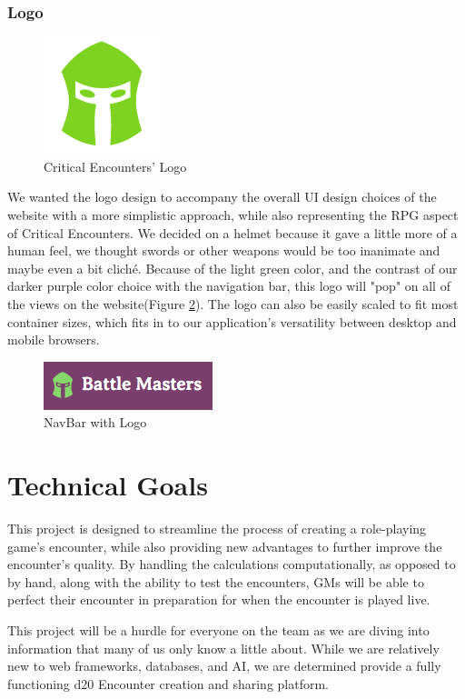 \documentclass[12pt,a4paper]{report}
\begin{document}
	\subsection {Logo}
	\begin{figure}[H]
		\centering
		\includegraphics[scale=.5]{logo-large}
		\caption{Critical Encounters' Logo}
		\label{fig: Critical Encounters' Logo}
	\end{figure}
	We wanted the logo design to accompany the overall UI design choices of the website with a more simplistic approach, while also representing the RPG aspect of Critical Encounters. We decided on a helmet because it gave a little more of a human feel, we thought swords or other weapons would be too inanimate and maybe even a bit cliché. Because of the light green color, and the contrast of our darker purple color choice with the navigation bar, this logo will "pop" on all of the views on the website(Figure \ref{fig: NavBar with Logo}). The logo can also be easily scaled to fit most container sizes, which fits in to our application's versatility between desktop and mobile browsers.
	\bigskip
	\begin{figure}[H]
		\centering
		\centerline{\includegraphics[scale=1]{navbar-logo}}
		\caption{NavBar with Logo}
		\label{fig: NavBar with Logo}
	\end{figure}
\newpage
\chapter*{Technical Goals}
This project is designed to streamline the process of creating a role-playing game's encounter, while also providing new advantages to further improve the encounter's quality. By handling the calculations computationally, as opposed to by hand, along with the ability to test the encounters, GMs will be able to perfect their encounter in preparation for when the encounter is played live.

This project will be a hurdle for everyone on the team as we are diving into information that many of us only know a little about. While we are relatively new to web frameworks, databases, and AI, we are determined provide a fully functioning d20 Encounter creation and sharing platform.
\end{document}
